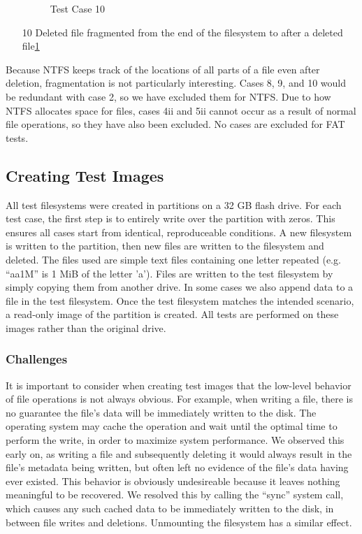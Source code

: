 \begin{itemize}
\begin{figure}[h]
        \caption{Test Case 10}
        \label{fig:case_10}
    \end{figure}
    \item [10] Deleted file fragmented from the end of the filesystem to after a deleted file\ref{fig:case_10}
\end{itemize}

Because NTFS keeps track of the locations of all parts of a file even after deletion, fragmentation is not particularly interesting. Cases 8, 9, and 10 would be redundant with case 2, so we have excluded them for NTFS. Due to how NTFS allocates space for files, cases 4ii and 5ii cannot occur as a result of normal file operations, so they have also been excluded. No cases are excluded for FAT tests.

\subsection{Creating Test Images}
All test filesystems were created in partitions on a 32 GB flash drive. For each test case, the first step is to entirely write over the partition with zeros. This ensures all cases start from identical, reproduceable conditions. A new filesystem is written to the partition, then new files are written to the filesystem and deleted. The files used are simple text files containing one letter repeated (e.g. ``aa1M'' is 1 MiB of the letter 'a'). Files are written to the test filesystem by simply copying them from another drive. In some cases we also append data to a file in the test filesystem. Once the test filesystem matches the intended scenario, a read-only image of the partition is created. All tests are performed on these images rather than the original drive.

\subsubsection{Challenges}
It is important to consider when creating test images that the low-level behavior of file operations is not always obvious. For example, when writing a file, there is no guarantee the file's data will be immediately written to the disk. The operating system may cache the operation and wait until the optimal time to perform the write, in order to maximize system performance. We observed this early on, as writing a file and subsequently deleting it would always result in the file's metadata being written, but often left no evidence of the file's data having ever existed. This behavior is obviously undesireable because it leaves nothing meaningful to be recovered. We resolved this by calling the ``sync'' system call, which causes any such cached data to be immediately written to the disk, in between file writes and deletions. Unmounting the filesystem has a similar effect.


